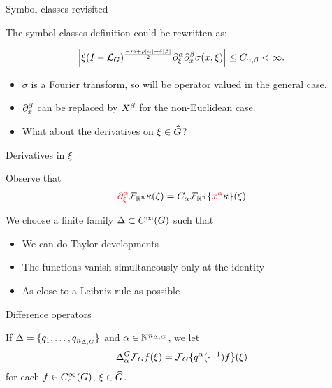 \documentclass{beamer}
\begin{document}
\begin{frame}
    {Symbol classes revisited}

    The symbol classes definition could be rewritten as:

    \begin{align*}
        \abs {%
            \xi
            \BesselPotential {-m + \rho \abs \alpha - \delta \abs \beta}
            \iD {\xi^\alpha}
            \iD {x^\beta}
            \sigma(x, \xi)
        } \leq
        C_{\alpha, \beta}
        < \infty.
    \end{align*}

    \pause
    \begin{itemize}
        \item $\sigma$ is a Fourier transform,
            so will be operator valued in the general case.
            \pause
        \item $\iD {x^\beta}$ can be replaced by $\LeftDifferentialOperator \beta$ for the non-Euclidean case.
            \pause
        \item What about the derivatives on $\xi \in {\widehat{G}}$?
    \end{itemize}
\end{frame}

\begin{frame}
    {Derivatives in $\xi$}

    Observe that
    \begin{align*}
        {\color{red} \iD {\xi^\alpha}} \Fourier [\R^n] \kappa(\xi)
        = C_\alpha \Fourier [\R^n] {\{{\color{red} x^\alpha} \kappa\}}(\xi)
    \end{align*}

    \pause
    We choose a finite family $\Delta \subset {C^\infty(G)}$ such that
    \begin{itemize}
        \pause
        \item
            We can do Taylor developments
            \pause
        \item The functions vanish simultaneously only at the identity
            \pause
        \item
            As close to a Leibniz rule as possible
    \end{itemize}
\end{frame}

\begin{frame}
    {Difference operators}

    \begin{definition}

        If $\Delta = \{q_1, \dots, q_{n_{\Delta, G}} \}$ and $\alpha \in \mathbb{N}^{n_{\Delta, G}}$,
        we let
        \begin{align*}
            {\Delta^{G}_{\alpha}} \mathcal{F}_{G} f(\xi)
            = \mathcal{F}_{G} \{q^\alpha(\cdot^{-1}) f\}(\xi)
        \end{align*}
        for each $f \in C^\infty_c(G)$,
        $\xi \in {\widehat{G}}$.
    \end{definition}
\end{frame}
\end{document}
